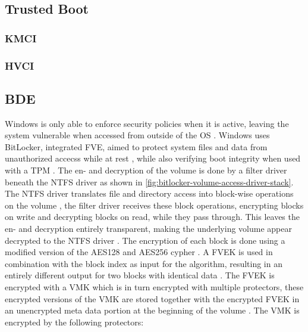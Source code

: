 \subsection{Trusted Boot}
\subsubsection{KMCI}
\subsubsection{HVCI}

\subsection{\acf{BDE}}
\label{sec:bde}
Windows is only able to enforce security policies when it is active, leaving the system vulnerable when accessed from outside of the \ac{OS} \cite[9. BitLocker Drive encryption]{windows-internals-6-part2}.
Windows uses BitLocker, integrated \ac{FVE}, aimed to protect system files and data from unauthorized accecss while at rest \cite{microsoft-bitlocker-overview}, while also verifying boot integrity when used with a \ac{TPM} \cite[9. BitLocker Drive encryption]{windows-internals-6-part2}.
The en- and decryption of the volume is done by a filter driver beneath the \ac{NTFS} driver as shown in \autoref{fig:bitlocker-volume-access-driver-stack}.
The \ac{NTFS} driver translates file and directory access into block-wise operations on the volume , the filter driver receives these block operations, encrypting blocks on write and decrypting blocks on read, while they pass through.
This leaves the en- and decryption entirely transparent, making the underlying volume appear decrypted to the \ac{NTFS} driver \cite[9. Full-Volume Encryption Driver]{windows-internals-6-part2}.
The encryption of each block is done using a modified version of the \ac{AES}128 and \ac{AES}256 cypher \cite[9. Encryption Keys]{windows-internals-6-part2}.
A \ac{FVEK} is used in combination with the block index as input for the algorithm, resulting in an entirely different output for two blocks with identical data \cite[9. Full-Volume Encryption Driver]{windows-internals-6-part2}.
The \ac{FVEK} is encrypted with a \ac{VMK} which is in turn encrypted with multiple protectors, these encrypted versions of the \ac{VMK} are stored together with the encrypted \ac{FVEK} in an unencrypted meta data portion at the beginning of the volume \cite[9. Encryption Keys]{windows-internals-6-part2}.
The \ac{VMK} is encrypted by the following protectors:

